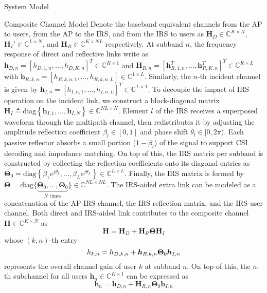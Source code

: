 \documentclass{IEEEtran}
\begin{document}
\begin{section}{System Model}
	\begin{subsection}{Composite Channel Model}
		Denote the baseband equivalent channels from the AP to users, from the AP to the IRS, and from the IRS to users as $\boldsymbol{H}_D \in \mathbb{C}^{K \times N}$, $\boldsymbol{H}_I' \in \mathbb{C}^{L \times N}$, and $\boldsymbol{H}_R \in \mathbb{C}^{K \times NL}$ respectively. At subband $n$, the frequency response of direct and reflective links write as $\boldsymbol{h}_{D,n}=[h_{D,1,n},\dots,h_{D,K,n}]^T \in \mathbb{C}^{K \times 1}$ and $\boldsymbol{H}_{R,n}=[\boldsymbol{h}_{R,1,n}^T,\dots,\boldsymbol{h}_{R,K,n}^T]^T \in \mathbb{C}^{K \times L}$ with $\boldsymbol{h}_{R,k,n}=[h_{R,k,n,1},\dots,h_{R,k,n,L}] \in \mathbb{C}^{1 \times L}$. Similarly, the $n$-th incident channel is given by $\boldsymbol{h}_{I,n}=[h_{I,n,1},\dots,h_{I,n,L}]^T \in \mathbb{C}^{L \times 1}$. To decouple the impact of IRS operation on the incident link, we construct a block-diagonal matrix $\boldsymbol{H}_I \triangleq \mathrm{diag}\left\{\boldsymbol{h}_{I,1},\dots,\boldsymbol{h}_{I,N}\right\} \in \mathbb{C}^{NL \times N}$. Element $l$ of the IRS receives a superposed waveform through the multipath channel, then redistributes it by adjusting the amplitude reflection coefficient $\beta_l \in [0,1]$ and phase shift $\theta_l \in [0,2\pi)$. Each passive reflector absorbs a small portion ($1 - \beta_l$) of the signal to support CSI decoding and impedance matching. On top of this, the IRS matrix per subband is constructed by collecting the reflection coefficients onto its diagonal entries as $\boldsymbol{\Theta}_0 = \mathrm{diag}\left\{\beta_1 e^{j \theta_1}, \dots, \beta_L e^{j \theta_L}\right\} \in \mathbb{C}^{L \times L}$. Finally, the IRS matrix is formed by $\boldsymbol{\Theta} = \mathrm{diag}\{\underbrace{\boldsymbol{\Theta}_0,\dots,\boldsymbol{\Theta}_0}_{N\text{ times}}\} \in \mathbb{C}^{NL \times NL}$. The IRS-aided extra link can be modeled as a concatenation of the AP-IRS channel, the IRS reflection matrix, and the IRS-user channel. Both direct and IRS-aided link contributes to the composite channel $\boldsymbol{H} \in \mathbb{C}^{K \times N}$ as
		\begin{equation}\label{eq:H}
			\boldsymbol{H} = \boldsymbol{H}_D+\boldsymbol{H}_R\boldsymbol{\Theta}\boldsymbol{H}_I
		\end{equation}
		whose $(k,n)$-th entry
		\begin{equation}\label{eq:h_{k,n}}
			h_{k,n}=h_{D,k,n}+\boldsymbol{h}_{R,k,n}\boldsymbol{\Theta}_0\boldsymbol{h}_{I,n}
		\end{equation}
		represents the overall channel gain of user $k$ at subband $n$. On top of this, the $n$-th subchannel for all users $\boldsymbol{h}_n \in \mathbb{C}^{K \times 1}$ can be expressed as
		\begin{equation}\label{eq:h_n}
			\boldsymbol{h}_n=\boldsymbol{h}_{D,n}+\boldsymbol{H}_{R,n}\boldsymbol{\Theta}_0\boldsymbol{h}_{I,n}
		\end{equation}
	\end{subsection}


\end{section}
\end{document}
